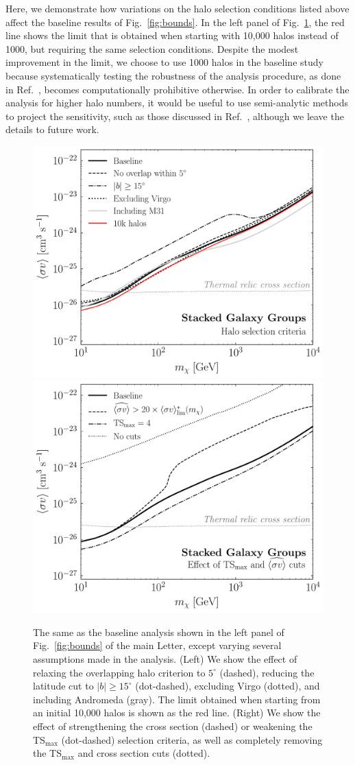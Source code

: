 Here, we demonstrate how variations on the halo selection conditions listed above affect the baseline results of Fig.~\ref{fig:bounds}.  In the left panel of Fig.~\ref{fig:cutsandhalos}, the red line shows the limit that is obtained when starting with 10,000 halos instead of 1000, but requiring the same selection conditions.  Despite the modest improvement in the limit, we choose to use 1000 halos in the baseline study because systematically testing the robustness of the analysis procedure, as done in Ref.~\cite{companion}, becomes computationally prohibitive otherwise. In order to calibrate the analysis for higher halo numbers, it would be useful to use semi-analytic methods to project the sensitivity, such as those discussed in Ref.~\cite{Cowan:2010js,Edwards:2017mnf}, although we leave the details to future work.

\begin{figure}[b]
  \centering
	\includegraphics[width=.45\textwidth]{ch-clusters/plots/systematics_nh.pdf} 
	\includegraphics[width=.45\textwidth]{ch-clusters/plots/systematics_cuts.pdf} 
  \caption{The same as the baseline analysis shown in the left panel of Fig.~\ref{fig:bounds} of the main Letter, except varying several assumptions made in the analysis.  (Left) We show the effect of relaxing the overlapping halo criterion to $5^\circ$ (dashed), reducing the latitude cut to $|b|\geq 15^\circ$ (dot-dashed), excluding Virgo (dotted), and including Andromeda (gray).  The limit obtained when starting from an initial 10,000 halos is shown as the red line.  (Right) We show the effect of strengthening the cross section (dashed) or weakening the TS$_\text{max}$ (dot-dashed) selection criteria, as well as completely removing the TS$_\text{max}$ and cross section cuts (dotted). }
  \label{fig:cutsandhalos}
\end{figure} 

